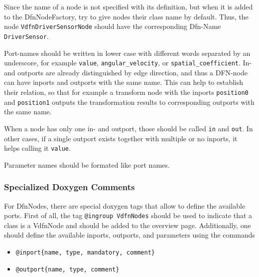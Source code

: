 Since the name of a node is not specified with its definition, but when it is added to the DfnNodeFactory, try to give nodes their class name by default. Thus, the node \texttt{VdfnDriverSensorNode} should have the corresponding Dfn-Name \texttt{DriverSensor}.

 Port-names should be written in lower case with different words separated by an underscore, for example \texttt{value}, \texttt{angular\_velocity}, or \texttt{spatial\_coefficient}. 
In- and outports are already distinguished by edge direction, and thus a DFN-node can have inports and outports with the same name. 
This can help to establish their relation, so that for example a transform node with the inports \texttt{position0} and \texttt{position1} outputs the transformation results to corresponding outports with the same name.

When a node has only one in- and outport, those should be called \texttt{in} and \texttt{out}.
In other cases, if a single outport exists together with multiple or no inports, it helps calling it \texttt{value}.

 Parameter names should be formated like port names.

\subsubsection{Specialized Doxygen Comments}
For DfnNodes, there are special doxygen tags that allow to define the available ports.
First of all, the tag \texttt{@ingroup VdfnNodes} should be used to indicate that a class is a VdfnNode and should be added to the overview page.
Additionally, one should define the available inports, outports, and parameters using the commands
\begin{itemize}
\item \texttt{@inport\{name, type, mandatory, comment\}}
\item \texttt{@outport\{name, type, comment\}}
\end{itemize}
